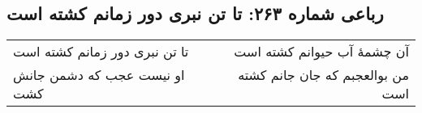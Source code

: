 \begin{center}
\section*{رباعی شماره ۲۶۳: تا تن نبری دور زمانم کشته است}
\label{sec:0263}
\begin{longtable}{l p{0.5cm} r}
تا تن نبری دور زمانم کشته است
&&
آن چشمهٔ آب حیوانم کشته است
\\
او نیست عجب که دشمن جانش کشت
&&
من بوالعجبم که جان جانم کشته است
\\
\end{longtable}
\end{center}
